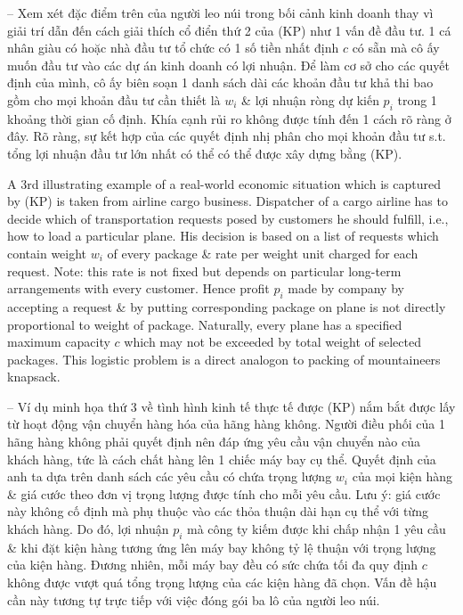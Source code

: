\documentclass{article}
\begin{document}
\begin{itemize}
\begin{itemize}
        -- Xem xét đặc điểm trên của người leo núi trong bối cảnh kinh doanh thay vì giải trí dẫn đến cách giải thích cổ điển thứ 2 của (KP) như 1 vấn đề đầu tư. 1 cá nhân giàu có hoặc nhà đầu tư tổ chức có 1 số tiền nhất định $c$ có sẵn mà cô ấy muốn đầu tư vào các dự án kinh doanh có lợi nhuận. Để làm cơ sở cho các quyết định của mình, cô ấy biên soạn 1 danh sách dài các khoản đầu tư khả thi bao gồm cho mọi khoản đầu tư cần thiết là $w_i$ \& lợi nhuận ròng dự kiến $p_i$ trong 1 khoảng thời gian cố định. Khía cạnh rủi ro không được tính đến 1 cách rõ ràng ở đây. Rõ ràng, sự kết hợp của các quyết định nhị phân cho mọi khoản đầu tư s.t. tổng lợi nhuận đầu tư lớn nhất có thể có thể được xây dựng bằng (KP).

        A 3rd illustrating example of a real-world economic situation which is captured by (KP) is taken from airline cargo business. Dispatcher of a cargo airline has to decide which of transportation requests posed by customers he should fulfill, i.e., how to load a particular plane. His decision is based on a list of requests which contain weight $w_i$ of every package \& rate per weight unit charged for each request. Note: this rate is not fixed but depends on particular long-term arrangements with every customer. Hence profit $p_i$ made by company by accepting a request \& by putting corresponding package on plane is not directly proportional to weight of package. Naturally, every plane has a specified maximum capacity $c$ which may not be exceeded by total weight of selected packages. This logistic problem is a direct analogon to packing of mountaineers knapsack.

        -- Ví dụ minh họa thứ 3 về tình hình kinh tế thực tế được (KP) nắm bắt được lấy từ hoạt động vận chuyển hàng hóa của hãng hàng không. Người điều phối của 1 hãng hàng không phải quyết định nên đáp ứng yêu cầu vận chuyển nào của khách hàng, tức là cách chất hàng lên 1 chiếc máy bay cụ thể. Quyết định của anh ta dựa trên danh sách các yêu cầu có chứa trọng lượng $w_i$ của mọi kiện hàng \& giá cước theo đơn vị trọng lượng được tính cho mỗi yêu cầu. Lưu ý: giá cước này không cố định mà phụ thuộc vào các thỏa thuận dài hạn cụ thể với từng khách hàng. Do đó, lợi nhuận $p_i$ mà công ty kiếm được khi chấp nhận 1 yêu cầu \& khi đặt kiện hàng tương ứng lên máy bay không tỷ lệ thuận với trọng lượng của kiện hàng. Đương nhiên, mỗi máy bay đều có sức chứa tối đa quy định $c$ không được vượt quá tổng trọng lượng của các kiện hàng đã chọn. Vấn đề hậu cần này tương tự trực tiếp với việc đóng gói ba lô của người leo núi.


\end{itemize}
\end{itemize}
\end{document}
